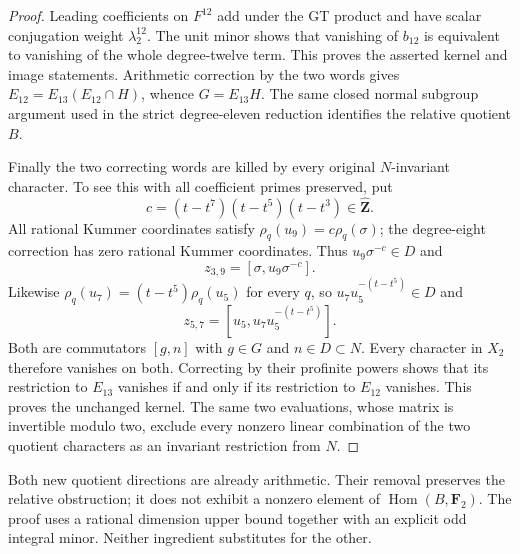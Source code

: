 \begin{proof}
Leading coefficients on $F^{12}$ add under the GT product and
have scalar conjugation weight $\lambda_2^{12}$. The unit minor
shows that vanishing of $b_{12}$ is equivalent to vanishing of
the whole degree-twelve term. This proves the asserted kernel
and image statements. Arithmetic correction by the two words
gives $E_{12}=E_{13}(E_{12}\cap H)$, whence $G=E_{13}H$.
The same closed normal subgroup argument used in the strict
degree-eleven reduction identifies the relative quotient $B$.

Finally the two correcting words are killed by every original
$N$-invariant character. To see this with all coefficient primes
preserved, put
\[
 c=(t-t^7)(t-t^5)(t-t^3)\in\widehat{\mathbf Z}.
\]
All rational Kummer coordinates satisfy
$\rho_q(u_9)=c\rho_q(\sigma)$; the degree-eight correction has
zero rational Kummer coordinates. Thus $u_9\sigma^{-c}\in D$
and
\[
 z_{3,9}=[\sigma,u_9\sigma^{-c}].
\]
Likewise $\rho_q(u_7)=(t-t^5)\rho_q(u_5)$ for every $q$, so
$u_7u_5^{-(t-t^5)}\in D$ and
\[
 z_{5,7}=[u_5,u_7u_5^{-(t-t^5)}].
\]
Both are commutators $[g,n]$ with $g\in G$ and $n\in D\subset N$.
Every character in $X_2$ therefore vanishes on both. Correcting
by their profinite powers shows that its restriction to $E_{13}$
vanishes if and only if its restriction to $E_{12}$ vanishes.
This proves the unchanged kernel. The same two evaluations,
whose matrix is invertible modulo two, exclude every nonzero
linear combination of the two quotient characters as an
invariant restriction from $N$.
\end{proof}

\begin{remark}
Both new quotient directions are already arithmetic. Their
removal preserves the relative obstruction; it does not exhibit
a nonzero element of $\operatorname{Hom}(B,\mathbf F_2)$.
The proof uses a rational dimension upper bound together with
an explicit odd integral minor. Neither ingredient substitutes
for the other.
\end{remark}
